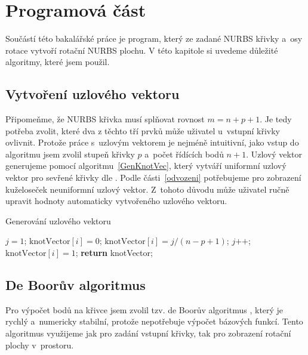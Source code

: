 \clearpage
\chapter{Programová část}\label{progCast}

Součástí této bakalářské práce je program, který ze zadané NURBS křivky a~osy rotace vytvoří rotační NURBS plochu. V této kapitole si uvedeme důležité algoritmy, které jsem použil.

\section{Vytvoření uzlového vektoru}
Připomeňme, že NURBS křivka musí splňovat rovnost $m=n+p+1$. Je tedy potřeba zvolit, které dva z těchto tří prvků může uživatel u~vstupní křivky ovlivnit. Protože práce s~uzlovým vektorem je nejméně intuitivní, jako vstup do algoritmu jsem zvolil stupeň křivky $p$ a~počet řídících bodů $n+1$. Uzlový vektor %
generujeme pomocí algoritmu~\ref{GenKnotVec}, který vytváří uniformní uzlový vektor pro sevřené křivky dle \cite{Shenec19972014}. Podle části~\ref{odvozeni} potřebujeme pro zobrazení kuželoseček neuniformní uzlový vektor. Z~tohoto důvodu může uživatel ručně upravit hodnoty automaticky vytvořeného uzlového vektoru.

\begin{algorithm}[H]
	\caption{Generování uzlového vektoru}
	\label{GenKnotVec}
	\begin{algorithmic}[1]
		\State $j=1$;
		\State $\text{knotVector}\left[i\right]=0$;
		\State $\text{knotVector}\left[i\right]=j/\left(n-p+1\right)$;
		\State $j\text{++}$;
		\Else
		\State $\text{knotVector}\left[i\right]=1$;
		\EndIf
		\EndFor
		\State \textbf{return} knotVector;
		\EndFunction
	\end{algorithmic}
\end{algorithm}


\section{De Boorův algoritmus}

Pro výpočet bodů na křivce jsem zvolil tzv. de Boorův algoritmus \cite{Jankauskas2010,Shenec19972014}, který je rychlý a~numericky stabilní, protože nepotřebuje výpočet bázových funkcí. Tento algoritmus využijeme jak pro zadání vstupní křivky, tak pro zobrazení rotační plochy v~prostoru.

